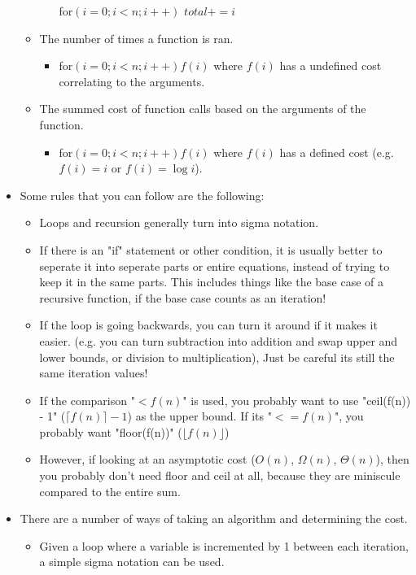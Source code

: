 \documentclass{article}
\begin{document}
\begin{itemize}
\begin{itemize}
\begin{itemize}
                        for$(i = 0; i < n; i++)$ $total += i$
                \end{itemize}
            \item The number of times a function is ran.
                \begin{itemize}
                    \item for$(i = 0; i < n; i++) f(i)$ where $f(i)$ has a undefined cost correlating to the arguments.
                \end{itemize}
            \item The summed cost of function calls based on the arguments of the function.
                \begin{itemize}
                    \item for$(i = 0; i < n; i++) f(i)$ where $f(i)$ has a defined cost (e.g. $f(i) = i$ or $f(i) = \log i$).
                \end{itemize}
        \end{itemize}
    \item Some rules that you can follow are the following:
        \begin{itemize}
            \item
                Loops and recursion generally turn into sigma notation.
            \item
                If there is an "if" statement or other condition, it is usually better to seperate it into seperate parts or entire equations, instead of trying to keep it in the same parts. This includes things like the base case of a recursive function, if the base case counts as an iteration!
            \item
                If the loop is going backwards, you can turn it around if it makes it easier. (e.g. you can turn subtraction into addition and swap upper and lower bounds, or division to multiplication), Just be careful its still the same iteration values!
            \item
                If the comparison "$< f(n)$" is used, you probably want to use "ceil(f(n)) - 1" ($\lceil f(n) \rceil - 1$) as the upper bound. If its "$<= f(n)$", you probably want "floor(f(n))" ($\lfloor f(n) \rfloor$)
            \item
                However, if looking at an asymptotic cost ($O(n)$, $\Omega(n)$, $\Theta(n)$), then you probably don't need floor and ceil at all, because they are miniscule compared to the entire sum.
        \end{itemize}
    \item There are a number of ways of taking an algorithm and determining the cost.
        \begin{itemize}
            \item
                Given a loop where a variable is incremented by 1 between each iteration, a simple sigma notation can be used.


\end{itemize}
\end{itemize}
\end{document}
